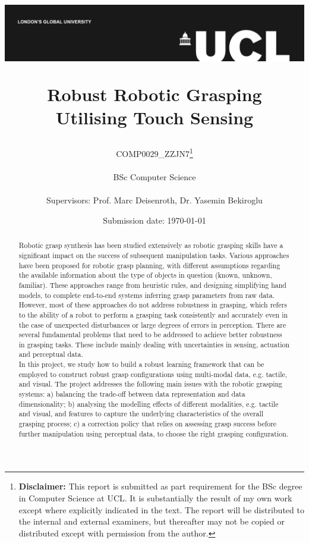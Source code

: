 \documentclass[11pt, a4paper]{report}
\title{{\vspace{-2in}\includegraphics[width=\textwidth]{docs/Project Report/Media/ucl_logo.png}}\\
\vspace{2cm}
\begin{adjustwidth}{1cm}{1cm}
    \centering
    \Huge Robust Robotic Grasping \\ Utilising Touch Sensing
\end{adjustwidth}}
\date{Submission date: \today}
\author{COMP0029\_ZZJN7\thanks{
{\bf Disclaimer:}
This report is submitted as part requirement for the BSc degree in Computer Science at UCL. It is
substantially the result of my own work except where explicitly indicated in the text. The report will be distributed to the internal and external examiners, but thereafter may not be copied or distributed except with permission from the author.}
\\ \\
BSc Computer Science\\ \\
Supervisors: Prof. Marc Deisenroth, Dr. Yasemin Bekiroglu}
\begin{document}
\onehalfspacing
\maketitle
{}

\begin{abstract}
Robotic grasp synthesis has been studied extensively as robotic grasping skills have a significant impact on the success of subsequent manipulation tasks. Various approaches have been proposed for robotic grasp planning, with different assumptions regarding the available information about the type of objects in question (known, unknown, familiar). These approaches range from heuristic rules, and designing simplifying hand models, to complete end-to-end systems inferring grasp parameters from raw data.\\

However, most of these approaches do not address robustness in grasping, which refers to the ability of a robot to perform a grasping task consistently and accurately even in the case of unexpected disturbances or large degrees of errors in perception. There are several fundamental problems that need to be addressed to achieve better robustness in grasping tasks. These include mainly dealing with uncertainties in sensing, actuation and perceptual data.\\

In this project, we study how to build a robust learning framework that can be employed to construct robust grasp configurations using multi-modal data, e.g. tactile, and visual. The project addresses the following main issues with the robotic grasping systems: a) balancing the trade-off between data representation and data dimensionality; b) analysing the modelling effects of different modalities, e.g. tactile and visual, and features to capture the underlying characteristics of the overall grasping process; c) a correction policy that relies on assessing grasp success before further manipulation using perceptual data, to choose the right grasping configuration.
\end{abstract}
\end{document}
